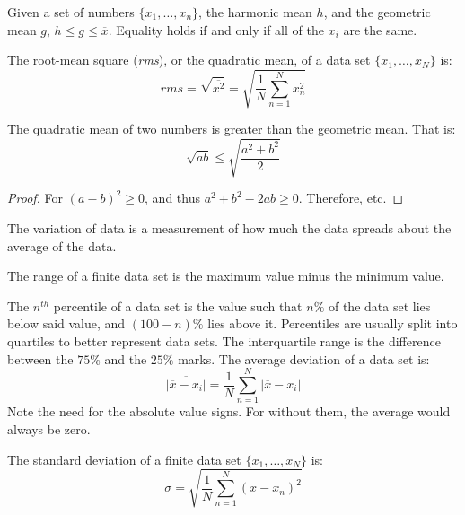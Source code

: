 \documentclass[crop=false,class=book,oneside]{standalone}                      %
\begin{document}
        \begin{theorem}
            Given a set of numbers $\{x_{1},\hdots,x_{n}\}$,
            the harmonic mean $h$, and the geometric mean $g$,
            $h\leq{g}\leq\overline{x}$. Equality holds if
            and only if all of the $x_{i}$ are the same.
        \end{theorem}
        \begin{definition}
            The root-mean square (\textit{rms}), or the
            quadratic mean, of a data set $\{x_{1},\hdots,x_{N}\}$
            is:
            \begin{equation*}
                rms=\sqrt{\overline{x^{2}}}
                =\sqrt{\frac{1}{N}\sum_{n=1}^{N}x_{n}^2}
            \end{equation*}
        \end{definition}
        \begin{theorem}
            The quadratic mean of two numbers is greater
            than the geometric mean. That is:
            \begin{equation*}
                \sqrt{ab}\leq\sqrt{\frac{a^{2}+b^{2}}{2}}
            \end{equation*}
        \end{theorem}
        \begin{proof}
            For $(a-b)^{2}\geq{0}$, and thus
            $a^{2}+b^{2}-2ab\geq{0}$. Therefore, etc.
        \end{proof}
        The variation of data is a measurement of how much
        the data spreads about the average of the data.
        \begin{definition}
            The range of a finite data set is the maximum value
            minus the minimum value.
        \end{definition}
        The $n^{th}$ percentile of a data set is the value such that
        $n\%$ of the data set lies below said value, and
        $(100-n)\%$ lies above it. Percentiles are usually split into
        quartiles to better represent data sets. The interquartile range
        is the difference between the $75\%$ and the $25\%$ marks.
        The average deviation of a data set is:
        \begin{equation*}
            \overline{|\overline{x}-x_{i}|}
            =\frac{1}{N}\sum_{n=1}^{N}|\overline{x}-x_{i}|
        \end{equation*}
        Note the need for the absolute value signs. For without them,
        the average would always be zero.
        \begin{definition}
            The standard deviation of a finite data set
            $\{x_{1},\hdots,x_{N}\}$ is:
            \begin{equation*}
                \sigma=
                \sqrt{\frac{1}{N}\sum_{n=1}^{N}(\overline{x}-x_{n})^{2}}
            \end{equation*}
        \end{definition}
\end{document}
